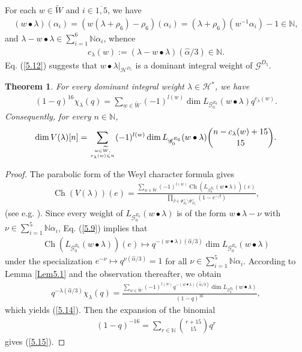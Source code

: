 \documentclass[12pt]{article}
\numberwithin{equation}{section}
\newtheorem{theorem}{Theorem}[section]
\theoremstyle{definition}
\theoremstyle{remark}
\begin{document}
For each $w\in\widetilde{W}$ and $i\in\overline{1,5}$, we have
\begin{eqnarray}
	(w\bullet\lambda)(\alpha_i)=(w(\lambda+\rho_6)-\rho_6)(\alpha_i)=(\lambda+\rho_6)(w^{-1}\alpha_i)-1\in\mathbb{N}, \label{5.12}
\end{eqnarray}
and $\lambda-w\bullet\lambda\in\sum_{i=1}^{6}\mathbb{N}\alpha_i$, whence
\begin{eqnarray}
	c_{\lambda}(w):=(\lambda-w\bullet\lambda)(\widehat{\alpha}/3)\in\mathbb{N}.\label{5.13}
\end{eqnarray}
Eq. (\ref{5.12}) suggests that $w\bullet\lambda|_{\mathscr{H}^{D_5}}$
is a dominant integral weight of $\mathscr{G}^{D_5}$.
\begin{theorem}\label{Thm5.2}
	For every dominant integral weight $\lambda\in \mathscr{H}^*$, we have
	\begin{eqnarray}
		(1-q)^{16}\chi_{\lambda}(q)=\sum_{w\in\widetilde{W}}(-1)^{l(w)}\dim L_{\mathscr{G}^{E_6}_0}(w\bullet\lambda)q^{c_{\lambda}(w)}. \label{5.14}
	\end{eqnarray}
	Consequently, for every $n\in\mathbb{N}$,
	\begin{eqnarray}
		\dim V(\lambda)[n]=\sum\limits_{w\in\widetilde{W},\atop c_{\lambda}(w)\leqslant n} (-1)^{l(w)}\dim L_{\mathscr{G}^{E_6}_0}(w\bullet\lambda)\binom{n-c_{\lambda}(w)+15}{15}. \label{5.15}
	\end{eqnarray}
\end{theorem}
\begin{proof}
	The parabolic form of the Weyl character formula gives
	\begin{eqnarray}
		\operatorname{Ch}(V(\lambda))(e)=\frac{\sum\limits_{w\in\widetilde{W}}(-1)^{l(w)}\operatorname{Ch}(L_{\mathscr{G}^{E_6}_0}(w\bullet\lambda))(e)}{\prod\limits_{\beta\in\Phi^+_{E_6}\setminus\Phi^+_{D_5}}(1-e^{-\beta})}, \label{5.16}
	\end{eqnarray}
	 (see e.g. \cite{GKRS}). Since every weight of $L_{\mathscr{G}^{E_6}_0}(w\bullet\lambda)$ is of the form $w\bullet\lambda-\nu$ with $\nu\in\sum_{i=1}^5\mathbb{N}\alpha_i$, Eq. (\ref{5.9}) implies that
	\begin{eqnarray}
		\operatorname{Ch}(L_{\mathscr{G}^{E_6}_0}(w\bullet\lambda))(e)\mapsto q^{-(w\bullet\lambda)(\widehat{\alpha}/3)}\dim L_{\mathscr{G}^{E_6}_0}(w\bullet\lambda)
	\end{eqnarray}
	under the specialization $e^{-\nu}\mapsto q^{\nu(\widehat{\alpha}/3)}=1$ for all $\nu\in\sum_{i=1}^5\mathbb{N}\alpha_i$.
	According to Lemma \ref{Lem5.1} and the observation thereafter, we obtain
	\begin{eqnarray}
		q^{-\lambda(\widehat{\alpha}/3)}\chi_\lambda(q)=\frac{\sum\limits_{w\in\widetilde{W}}(-1)^{l(w)}q^{-(w\bullet\lambda)(\widehat{\alpha}/3)}\dim L_{\mathscr{G}^{E_6}_0}(w\bullet\lambda)}{(1-q)^{16}},
	\end{eqnarray}
	which yields (\ref{5.14}). Then the expansion of the binomial
	\begin{eqnarray}
		(1-q)^{-16}=\sum_{r\in\mathbb{N}}\binom{r+15}{15}q^r
	\end{eqnarray}
	gives (\ref{5.15}).
\end{proof}
\end{document}
